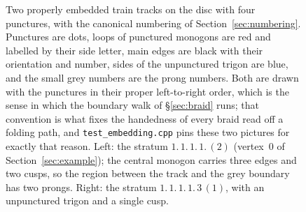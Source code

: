 \documentclass[12pt]{amsart}
\theoremstyle{plain}
\theoremstyle{definition}
\begin{document}
\begin{figure}[t]
  \caption{Two properly embedded train tracks on the disc with four
    punctures, with the canonical numbering of Section~\ref{sec:numbering}.  Punctures are dots,
    loops of punctured monogons are red and labelled by their side
    letter, main edges are black with their orientation and number, sides
    of the unpunctured trigon are blue, and the small grey numbers are the
    prong numbers.  Both are drawn with the punctures in their proper
    left-to-right order, which is the sense in which the boundary walk of
    \S\ref{sec:braid} runs; that convention is what fixes the handedness
    of every braid read off a folding path, and
    \texttt{test\_embedding.cpp} pins these two pictures for exactly that
    reason.  Left: the stratum $1.\,1.\,1.\,1.\,(2)$
    (vertex~0 of Section~\ref{sec:example}); the central monogon carries
    three edges and two cusps, so the region between the track and the
    grey boundary has two prongs.  Right: the stratum $1.\,1.\,1.\,1.\,3\,(1)$,
    with an unpunctured trigon and a single cusp.}
  \label{fig:tracks}
\end{figure}
\end{document}
